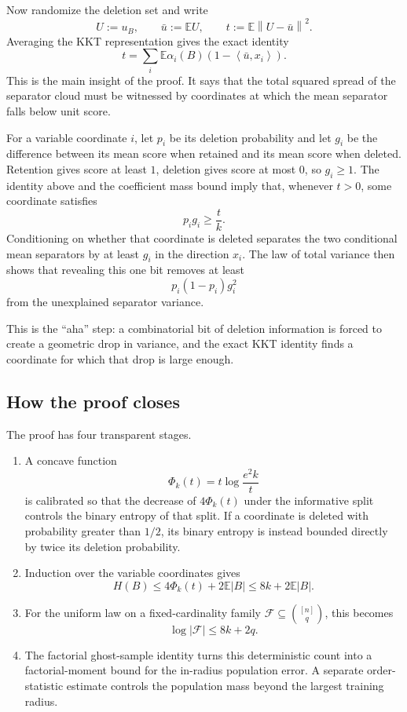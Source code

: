 \documentclass[11pt]{article}
\theoremstyle{definition}
\theoremstyle{remark}
\newcommand{\E}{\mathbb E}
\newcommand{\ip}[2]{\left\langle #1,#2\right\rangle}
\newcommand{\norm}[1]{\left\lVert #1\right\rVert}
\begin{document}
Now randomize the deletion set and write
\[
 U:=u_B,\qquad
 \bar u:=\E U,\qquad
 t:=\E\norm{U-\bar u}^2.
\]
Averaging the KKT representation gives the exact identity
\[
 t=
 \sum_i \E\alpha_i(B)
 \left(1-\ip{\bar u}{x_i}\right).
\]
This is the main insight of the proof. It says that the total squared spread
of the separator cloud must be witnessed by coordinates at which the mean
separator falls below unit score.

For a variable coordinate \(i\), let \(p_i\) be its deletion probability and
let \(g_i\) be the difference between its mean score when retained and its
mean score when deleted. Retention gives score at least \(1\), deletion gives
score at most \(0\), so \(g_i\ge1\). The identity above and the coefficient
mass bound imply that, whenever \(t>0\), some coordinate satisfies
\[
 p_i g_i\ge\frac{t}{k}.
\]
Conditioning on whether that coordinate is deleted separates the two
conditional mean separators by at least \(g_i\) in the direction \(x_i\).
The law of total variance then shows that revealing this one bit removes at
least
\[
 p_i(1-p_i)g_i^2
\]
from the unexplained separator variance.

This is the ``aha'' step: a combinatorial bit of deletion information is
forced to create a geometric drop in variance, and the exact KKT identity
finds a coordinate for which that drop is large enough.

\subsection{How the proof closes}

The proof has four transparent stages.

\begin{enumerate}
\item A concave function
\[
 \Phi_k(t)=t\log\frac{e^2k}{t}
\]
is calibrated so that the decrease of \(4\Phi_k(t)\) under the informative
split controls the binary entropy of that split. If a coordinate is deleted
with probability greater than \(1/2\), its binary entropy is instead bounded
directly by twice its deletion probability.

\item Induction over the variable coordinates gives
\[
 H(B)\le4\Phi_k(t)+2\E|B|
       \le8k+2\E|B|.
\]

\item For the uniform law on a fixed-cardinality family
\(\mathcal F\subseteq\binom{[n]}q\), this becomes
\[
 \log|\mathcal F|\le8k+2q.
\]

\item The factorial ghost-sample identity turns this deterministic count into
a factorial-moment bound for the in-radius population error. A separate
order-statistic estimate controls the population mass beyond the largest
training radius.
\end{enumerate}
\end{document}
